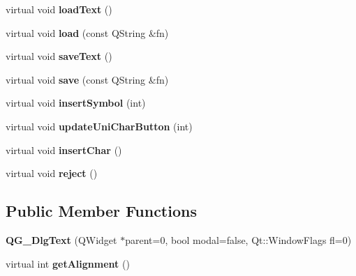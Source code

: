 \begin{DoxyCompactItemize}
\item 
\hypertarget{classQG__DlgText_ae59158b9c574073eba07ee226d9755ef}{virtual void {\bfseries load\-Text} ()}\label{classQG__DlgText_ae59158b9c574073eba07ee226d9755ef}

\item 
\hypertarget{classQG__DlgText_a50518cacff197d36c266a726938f3c72}{virtual void {\bfseries load} (const Q\-String \&fn)}\label{classQG__DlgText_a50518cacff197d36c266a726938f3c72}

\item 
\hypertarget{classQG__DlgText_a69ae87cb827d545d1ba73f5a010ae70c}{virtual void {\bfseries save\-Text} ()}\label{classQG__DlgText_a69ae87cb827d545d1ba73f5a010ae70c}

\item 
\hypertarget{classQG__DlgText_a376476042d6713e17b32beed13b7cbc6}{virtual void {\bfseries save} (const Q\-String \&fn)}\label{classQG__DlgText_a376476042d6713e17b32beed13b7cbc6}

\item 
\hypertarget{classQG__DlgText_a4be34ecba1a7e448dacc9661a1a0ac4a}{virtual void {\bfseries insert\-Symbol} (int)}\label{classQG__DlgText_a4be34ecba1a7e448dacc9661a1a0ac4a}

\item 
\hypertarget{classQG__DlgText_abae9bd44722573819ba77c982cd43d45}{virtual void {\bfseries update\-Uni\-Char\-Button} (int)}\label{classQG__DlgText_abae9bd44722573819ba77c982cd43d45}

\item 
\hypertarget{classQG__DlgText_a3259b4654f024006021d039160beaa15}{virtual void {\bfseries insert\-Char} ()}\label{classQG__DlgText_a3259b4654f024006021d039160beaa15}

\item 
\hypertarget{classQG__DlgText_ab02951f9a1e19409f6f8f025411474c6}{virtual void {\bfseries reject} ()}\label{classQG__DlgText_ab02951f9a1e19409f6f8f025411474c6}

\end{DoxyCompactItemize}
\subsection*{Public Member Functions}
\begin{DoxyCompactItemize}
\item 
\hypertarget{classQG__DlgText_aefa84687e88815744884368f411c2298}{{\bfseries Q\-G\-\_\-\-Dlg\-Text} (Q\-Widget $\ast$parent=0, bool modal=false, Qt\-::\-Window\-Flags fl=0)}\label{classQG__DlgText_aefa84687e88815744884368f411c2298}

\item 
\hypertarget{classQG__DlgText_a4a1fdb79bb1744b1a77a70da27c940f8}{virtual int {\bfseries get\-Alignment} ()}\label{classQG__DlgText_a4a1fdb79bb1744b1a77a70da27c940f8}

\end{DoxyCompactItemize}
